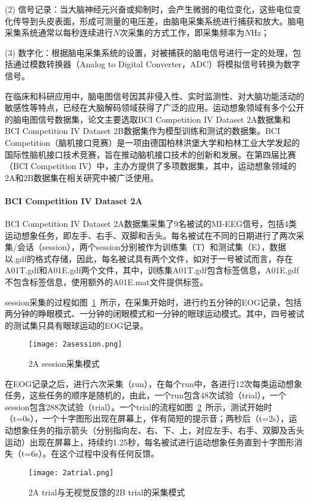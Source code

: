 (2) 信号记录：当大脑神经元兴奋或抑制时，会产生微弱的电位变化，这些电位变化传导到头皮表面，形成可测量的电压差，由脑电采集系统进行捕获和放大。脑电采集系统通常以每秒连续进行\(N\)次采集的方式工作，即采集频率为\(N\)Hz；

(3) 数字化：根据脑电采集系统的设置，对被捕获的脑电信号进行一定的处理，包括通过模数转换器（Analog to Digital Converter，ADC）将模拟信号转换为数字信号。

在临床和科研应用中，脑电图信号因其非侵入性、实时监测性、对大脑功能活动的敏感性等特点，已经在大脑解码领域获得了广泛的应用。运动想象领域有多个公开的脑电图信号数据集，论文主要选取BCI Competition IV Dataset 2A\cite{brunner2008bci}数据集和BCI Competition IV Dataset 2B\cite{leeb2008bci}数据集作为模型训练和测试的数据集。BCI Competition（脑机接口竞赛）是一项由德国柏林洪堡大学和柏林工业大学发起的国际性脑机接口技术竞赛，旨在推动脑机接口技术的创新和发展。在第四届比赛（BCI Competition IV）中，主办方提供了多项数据集，其中，运动想象领域的2A和2B数据集在相关研究中被广泛使用。

\paragraph{BCI Competition IV Dataset 2A}

BCI Competition IV Dataset 2A数据集采集了9名被试的MI-EEG信号，包括4类运动想象任务，即左手、右手、双脚和舌头。每名被试在不同的日期进行了两次采集/会话（session），两个session分别被作为训练集（T）和测试集（E），数据以.gdf的格式存储，因此，每名被试具有两个文件，如对于一号被试而言，存在A01T.gdf和A01E.gdf两个文件，其中，训练集A01T.gdf包含标签信息，A01E.gdf不包含标签信息，使用额外的A01E.mat文件提供标签。

session采集的过程如图~\ref{fig:2asession}~所示，在采集开始时，进行约五分钟的EOG记录，包括两分钟的睁眼模式、一分钟的闭眼模式和一分钟的眼球运动模式。其中，四号被试的测试集只具有眼球运动的EOG记录。
\begin{figure}
    \centering
    \texttt{[image: 2asession.png]}
    \caption{2A session采集模式\cite{brunner2008bci}}
    \label{fig:2asession}
\end{figure}

在EOG记录之后，进行六次采集（run），在每个run中，各进行12次每类运动想象任务，这些任务的顺序是随机的，由此，一个run包含48次试验（trial），一个session包含288次试验（trial）。一个trial的流程如图~\ref{fig:2atrial}~所示，测试开始时（t=0s），一个十字图形出现在屏幕上，伴有简短的提示音；两秒后（t=2s），运动想象任务的指示箭头（分别指向左、右、下、上，对应左手、右手、双脚及舌头运动）出现在屏幕上，持续约1.25秒，每名被试进行运动想象任务直到十字图形消失（t=6s）。在这个过程中没有任何反馈。
\begin{figure}
    \centering
    \texttt{[image: 2atrial.png]}
    \caption{2A trial与无视觉反馈的2B trial的采集模式\cite{brunner2008bci,leeb2008bci}}
    \label{fig:2atrial}
\end{figure}

